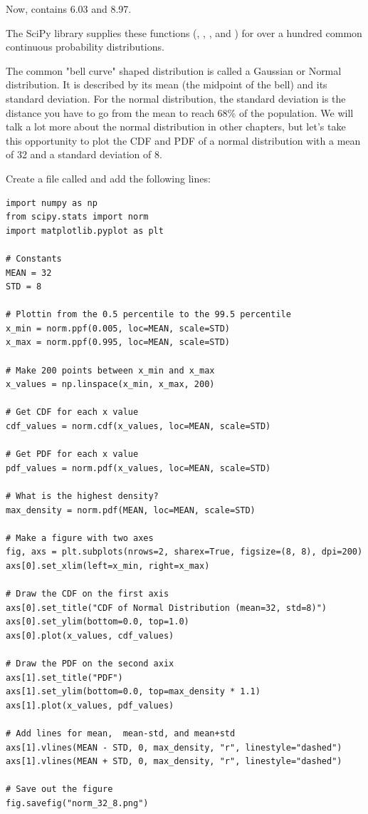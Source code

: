 Now,  contains 6.03 and 8.97.

The SciPy library supplies these functions (, ,  , and ) for over a hundred 
common continuous probability distributions.   

The common "bell curve" shaped distribution is called a Gaussian  or Normal distribution.  It is described by its mean (the midpoint of the bell) and its standard deviation.   For the normal distribution,  the standard deviation is the distance you have to go from the mean to reach 68\% of the population. 
We will talk a lot more about the normal distribution in other chapters,  but let's take this opportunity to plot the CDF and PDF of a normal distribution with a mean of 32 and a standard deviation of 8.

Create a file called  and add the following lines:

\begin{verbatim}
import numpy as np
from scipy.stats import norm
import matplotlib.pyplot as plt

# Constants
MEAN = 32
STD = 8

# Plottin from the 0.5 percentile to the 99.5 percentile
x_min = norm.ppf(0.005, loc=MEAN, scale=STD)
x_max = norm.ppf(0.995, loc=MEAN, scale=STD)

# Make 200 points between x_min and x_max
x_values = np.linspace(x_min, x_max, 200)

# Get CDF for each x value
cdf_values = norm.cdf(x_values, loc=MEAN, scale=STD)

# Get PDF for each x value
pdf_values = norm.pdf(x_values, loc=MEAN, scale=STD)

# What is the highest density?
max_density = norm.pdf(MEAN, loc=MEAN, scale=STD)

# Make a figure with two axes
fig, axs = plt.subplots(nrows=2, sharex=True, figsize=(8, 8), dpi=200)
axs[0].set_xlim(left=x_min, right=x_max)

# Draw the CDF on the first axis
axs[0].set_title("CDF of Normal Distribution (mean=32, std=8)")
axs[0].set_ylim(bottom=0.0, top=1.0)
axs[0].plot(x_values, cdf_values)

# Draw the PDF on the second axix
axs[1].set_title("PDF")
axs[1].set_ylim(bottom=0.0, top=max_density * 1.1)
axs[1].plot(x_values, pdf_values)

# Add lines for mean,  mean-std, and mean+std
axs[1].vlines(MEAN - STD, 0, max_density, "r", linestyle="dashed")
axs[1].vlines(MEAN + STD, 0, max_density, "r", linestyle="dashed")

# Save out the figure
fig.savefig("norm_32_8.png")
\end{verbatim}

